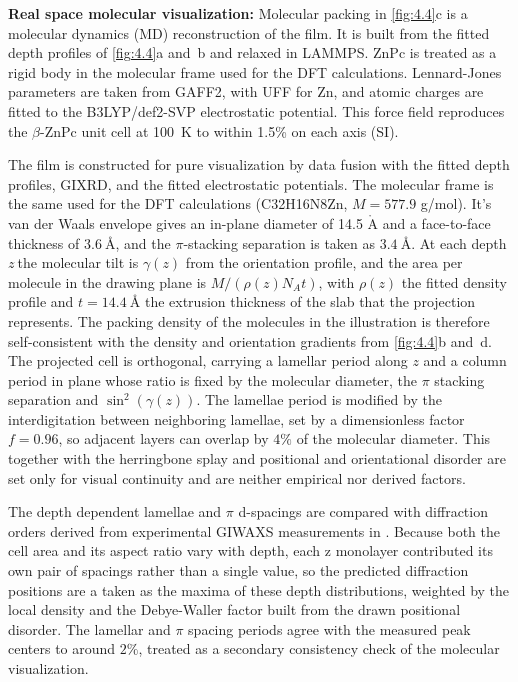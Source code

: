 \textbf{Real space molecular visualization:} Molecular packing in \cref{fig:4.4}c is a molecular dynamics (MD) reconstruction of the film. It is built from the fitted depth profiles of \cref{fig:4.4}a and~b and relaxed in LAMMPS.\autocite{thompsonLAMMPSFlexibleSimulation2022} ZnPc is treated as a rigid body in the molecular frame used for the DFT calculations. Lennard-Jones parameters are taken from GAFF2, with UFF for Zn, and atomic charges are fitted to the B3LYP/def2-SVP electrostatic potential. This force field reproduces the \(\beta\)-ZnPc unit cell at \qty{100}{K} to within 1.5\% on each axis (SI).

The film is constructed for pure visualization by data fusion with the fitted depth profiles, GIXRD, and the fitted electrostatic potentials. The molecular frame is the same used for the DFT calculations (C32H16N8Zn, \(M = 577.9\) g/mol). It's van der Waals envelope gives an in-plane diameter of 14.5 \(\mathring{\mathrm{A}}\) and a face-to-face thickness of \(\qty{3.6}{\angstrom}\), and the \(\pi\)-stacking separation is taken as \(\qty{3.4}{\angstrom}\). At each depth \(z\ \)the molecular tilt is \(\gamma(z)\) from the orientation profile, and the area per molecule in the drawing plane is \(M/(\rho(z)N_{A}t)\), with \(\rho(z)\) the fitted density profile and \(t = \qty{14.4}{\angstrom}\) the extrusion thickness of the slab that the projection represents. The packing density of the molecules in the illustration is therefore self-consistent with the density and orientation gradients from \cref{fig:4.4}b and~d. The projected cell is orthogonal, carrying a lamellar period along \(z\) and a column period in plane whose ratio is fixed by the molecular diameter, the \(\pi\) stacking separation and \(\sin^{2}\left( \gamma(z) \right)\). The lamellae period is modified by the interdigitation between neighboring lamellae, set by a dimensionless factor \(f = 0.96\), so adjacent layers can overlap by \(4\%\) of the molecular diameter. This together with the herringbone splay and positional and orientational disorder are set only for visual continuity and are neither empirical nor derived factors.

The depth dependent lamellae and \(\pi\) d-spacings are compared with diffraction orders derived from experimental GIWAXS measurements in . Because both the cell area and its aspect ratio vary with depth, each z monolayer contributed its own pair of spacings rather than a single value, so the predicted diffraction positions are a taken as the maxima of these depth distributions, weighted by the local density and the Debye-Waller factor built from the drawn positional disorder. The lamellar and \(\pi\) spacing periods agree with the measured peak centers to around \(2\%\), treated as a secondary consistency check of the molecular visualization.

